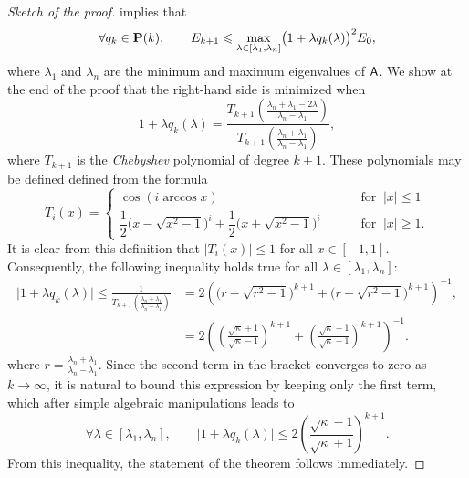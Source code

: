 \begin{proof}
    [Sketch of the proof]
 implies that
\begin{equation*}
    \forall q_k \in \mathbf P(k), \qquad
    E_{k+1} \leqslant  \max_{\lambda \in [\lambda_1, \lambda_n]}\bigl(1 + \lambda q_k(\lambda) \bigr)^2   E_0,
\end{equation*}
where $\lambda_1$ and $\lambda_n$ are the minimum and maximum eigenvalues of $\mathsf A$.
We show at the end of the proof that the right-hand side is minimized when
\begin{equation}
    \label{eq:conjugate_gradient_optimal_polynom}
    1 + \lambda q_k(\lambda) = \frac{T_{k+1}\left(\frac{\lambda_n + \lambda_1 - 2\lambda}{\lambda_n - \lambda_1}\right)}{T_{k+1}\left(\frac{\lambda_n + \lambda_1}{\lambda_n - \lambda_1}\right)},
\end{equation}
where $T_{k+1}$ is the \emph{Chebyshev} polynomial of degree $k+1$.
These polynomials may be defined defined from the formula
\begin{equation}
    \label{eq:chebyshev_polynomials}
    T_i(x) =
    \begin{cases}
        \cos(i\arccos x) \qquad & \text{ for }~ |x| \le 1 \\
        \dfrac{1}{2} \Big(x-\sqrt{x^2-1} \Big)^i + \dfrac{1}{2} \Big(x+\sqrt{x^2-1} \Big)^i   \qquad & \text{ for }~ |x| \ge 1.
    \end{cases}
\end{equation}
It is clear from this definition that $|T_i(x)| \leq 1$ for all $x \in [-1, 1]$.
Consequently, the following inequality holds true for all $\lambda \in [\lambda_1, \lambda_n]$:
\begin{align*}
    \bigl\lvert 1 + \lambda q_k(\lambda) \bigr\rvert
    \leq \frac{1}{T_{k+1}\left(\frac{\lambda_n + \lambda_1}{\lambda_n - \lambda_1}\right)}
    &= 2\left( \Big(r-\sqrt{r^2-1} \Big)^{k+1} + \Big(r+\sqrt{r^2-1}\Big)^{k+1} \right)^{-1},  \\
    &= 2 \left( \left( \frac{\sqrt{\kappa} + 1}{\sqrt{\kappa} - 1} \right)^{k+1} + \left( \frac{\sqrt{\kappa} - 1}{\sqrt{\kappa} + 1} \right)^{k+1} \right)^{-1}.
\end{align*}
where $r = \frac{\lambda_n + \lambda_1}{\lambda_n - \lambda_1}$.
Since the second term in the bracket converges to zero as $k \to \infty$,
it is natural to bound this expression by keeping only the first term,
which after simple algebraic manipulations leads to
\[
    \forall \lambda \in [\lambda_1, \lambda_n], \qquad
    \bigl\lvert 1 + \lambda q_k(\lambda) \bigr\rvert
    \leq 2 \left( \frac{\sqrt{\kappa} - 1}{\sqrt{\kappa} + 1} \right)^{k+1}.
\]
From this inequality,
the statement of the theorem follows immediately.


\end{proof}
